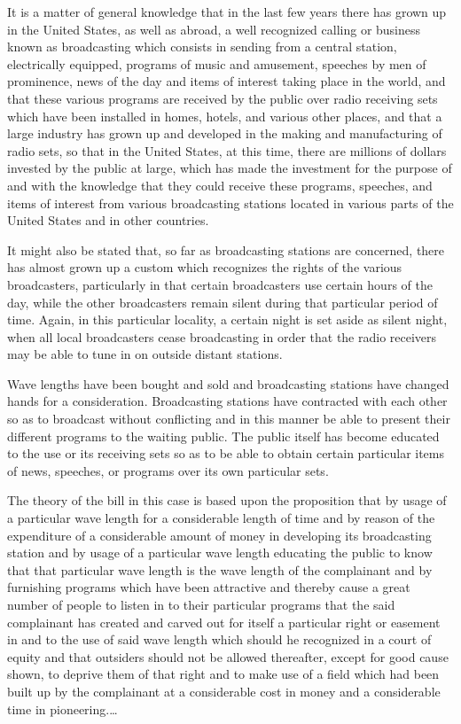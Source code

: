 It is a matter of general knowledge that in the last few years there has grown
up in the United States, as well as abroad, a well recognized calling or
business known as broadcasting which consists in sending from a central
station, electrically equipped, programs of music and amusement, speeches by
men of prominence, news of the day and items of interest taking place in the
world, and that these various programs are received by the public over radio
receiving sets which have been installed in homes, hotels, and various other
places, and that a large industry has grown up and developed in the making and
manufacturing of radio sets, so that in the United States, at this time, there
are millions of dollars invested by the public at large, which has made the
investment for the purpose of and with the knowledge that they could receive
these programs, speeches, and items of interest from various broadcasting
stations located in various parts of the United States and in other countries.

It might also be stated that, so far as broadcasting stations are concerned,
there has almost grown up a custom which recognizes the rights of the various
broadcasters, particularly in that certain broadcasters use certain
hours of the day, while the other broadcasters remain silent during that
particular period of time. Again, in this particular locality, a certain night
is set aside as silent night, when all local broadcasters cease broadcasting in
order that the radio receivers may be able to tune in on outside distant
stations.

Wave lengths have been bought and sold and broadcasting stations have changed
hands for a consideration. Broadcasting stations have contracted with each
other so as to broadcast without conflicting and in this manner be able to
present their different programs to the waiting public. The public itself has
become educated to the use or its receiving sets so as to be able to obtain
certain particular items of news, speeches, or programs over its own particular
sets.

The theory of the bill in this case is based upon the proposition that by usage
of a particular wave length for a considerable length of time and by reason of
the expenditure of a considerable amount of money in developing its
broadcasting station and by usage of a particular wave length educating the
public to know that that particular wave length is the wave length of the
complainant and by furnishing programs which have been attractive and thereby
cause a great number of people to listen in to their particular programs that
the said complainant has created and carved out for itself a particular right
or easement in and to the use of said wave length which should he recognized
in a court of equity and that outsiders should not be allowed thereafter,
except for good cause shown, to deprive them of that right and to make use of a
field which had been built up by the complainant at a considerable cost in
money and a considerable time in pioneering.\ldots

